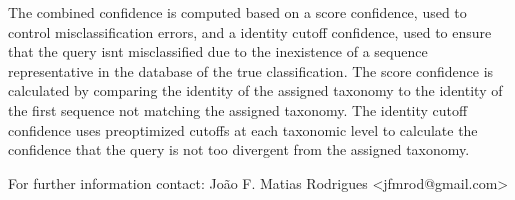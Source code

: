 \documentclass[10pt,a4paper]{article}
\begin{document}
The combined confidence is computed based on a score confidence, used to control misclassification errors, and a identity cutoff confidence, used to ensure that the query isnt misclassified due to the inexistence of a sequence representative in the database of the true classification. The score confidence is
calculated by comparing the identity of the assigned taxonomy to the identity of the first sequence not matching the assigned taxonomy.
The identity cutoff confidence uses preoptimized cutoffs at each taxonomic level to calculate the confidence that the query is not too divergent from the assigned taxonomy.


For further information contact: Jo\~ao F. Matias Rodrigues {\textless}jfmrod@gmail.com\textgreater
\end{document}
